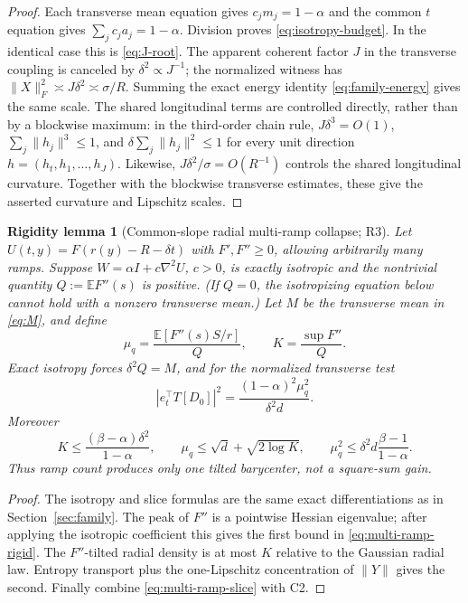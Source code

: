 \documentclass[11pt]{article}
\numberwithin{equation}{section}
\newtheorem{rigidity}[theorem]{Rigidity lemma}
\newcommand{\E}{\mathbb E}
\begin{document}
\begin{proof}
Each transverse mean equation gives $c_jm_j=1-\alpha$ and the common
$t$ equation gives $\sum_jc_ja_j=1-\alpha$.  Division proves
\eqref{eq:isotropy-budget}.  In the identical case this is
\eqref{eq:J-root}.  The apparent coherent factor $J$ in the transverse
coupling is canceled by $\delta^2\propto J^{-1}$; the normalized witness has
$\|X\|_F^2\asymp J\delta^2\asymp\sigma/R$.  Summing the exact energy
identity \eqref{eq:family-energy} gives the same scale.  The shared
longitudinal terms are controlled directly, rather than by a blockwise
maximum: in the third-order chain rule,
$J\delta^3=O(1)$, $\sum_j\|h_j\|^3\le1$, and
$\delta\sum_j\|h_j\|^2\le1$ for every unit direction
$h=(h_t,h_1,\ldots,h_J)$.  Likewise,
$J\delta^2/\sigma=O(R^{-1})$ controls the shared longitudinal curvature.
Together with the blockwise transverse estimates, these give the asserted
curvature and Lipschitz scales.
\end{proof}

\begin{rigidity}[Common-slope radial multi-ramp collapse; R3]
\label{rig:multi-ramp}
Let $U(t,y)=F(r(y)-R-\delta t)$ with $F',F''\ge0$, allowing arbitrarily
many ramps.  Suppose
$W=\alpha I+c\nabla^2U$, $c>0$, is exactly isotropic and the nontrivial
quantity $Q:=\E F''(s)$ is positive.  (If $Q=0$, the isotropizing equation
below cannot hold with a nonzero transverse mean.)  Let $M$ be the
transverse mean in \eqref{eq:M}, and define
\[
 \mu_q=\frac{\E[F''(s)S/r]}{Q},\qquad
 K=\frac{\sup F''}{Q}.
\]
Exact isotropy forces $\delta^2Q=M$, and for the normalized transverse test
\begin{equation}\label{eq:multi-ramp-slice}
 |e_t^\top T[D_0]|^2
 =\frac{(1-\alpha)^2\mu_q^2}{\delta^2d}.
\end{equation}
Moreover
\begin{equation}\label{eq:multi-ramp-rigid}
 K\le\frac{(\beta-\alpha)\delta^2}{1-\alpha},\qquad
 \mu_q\le\sqrt d+\sqrt{2\log K},\qquad
 \mu_q^2\le\delta^2d\frac{\beta-1}{1-\alpha}.
\end{equation}
Thus ramp count produces only one tilted barycenter, not a square-sum gain.
\end{rigidity}

\begin{proof}
The isotropy and slice formulas are the same exact differentiations as in
Section~\ref{sec:family}.  The peak of $F''$ is a pointwise Hessian
eigenvalue; after applying the isotropic coefficient this gives the first
bound in \eqref{eq:multi-ramp-rigid}.  The $F''$-tilted radial density is at
most $K$ relative to the Gaussian radial law.  Entropy transport plus the
one-Lipschitz concentration of $\|Y\|$ gives the second.  Finally combine
\eqref{eq:multi-ramp-slice} with C2.
\end{proof}
\end{document}
